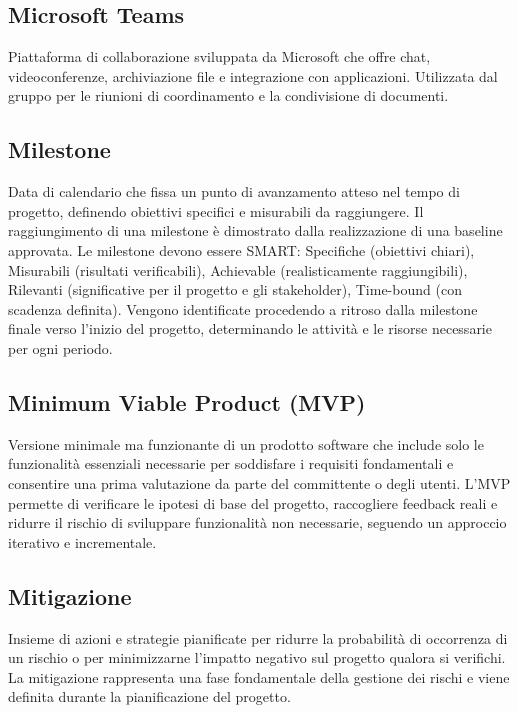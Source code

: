 \documentclass[a4paper,11pt]{article}
\begin{document}
\subsection{Microsoft Teams}
Piattaforma di collaborazione sviluppata da Microsoft che offre chat, videoconferenze, archiviazione file e integrazione con applicazioni. Utilizzata dal gruppo per le riunioni di coordinamento e la condivisione di documenti.









\subsection{Milestone}
Data di calendario che fissa un punto di avanzamento atteso nel tempo di progetto, definendo obiettivi specifici e misurabili da raggiungere. Il raggiungimento di una milestone è dimostrato dalla realizzazione di una baseline approvata. Le milestone devono essere SMART: Specifiche (obiettivi chiari), Misurabili (risultati verificabili), Achievable (realisticamente raggiungibili), Rilevanti (significative per il progetto e gli stakeholder), Time-bound (con scadenza definita). Vengono identificate procedendo a ritroso dalla milestone finale verso l'inizio del progetto, determinando le attività e le risorse necessarie per ogni periodo.









\subsection{Minimum Viable Product (MVP)}
Versione minimale ma funzionante di un prodotto software che include solo le funzionalità essenziali necessarie per soddisfare i requisiti fondamentali e consentire una prima valutazione da parte del committente o degli utenti. L'MVP permette di verificare le ipotesi di base del progetto, raccogliere feedback reali e ridurre il rischio di sviluppare funzionalità non necessarie, seguendo un approccio iterativo e incrementale.









\subsection{Mitigazione}
Insieme di azioni e strategie pianificate per ridurre la probabilità di occorrenza di un rischio o per minimizzarne l'impatto negativo sul progetto qualora si verifichi. La mitigazione rappresenta una fase fondamentale della gestione dei rischi e viene definita durante la pianificazione del progetto.
\end{document}

